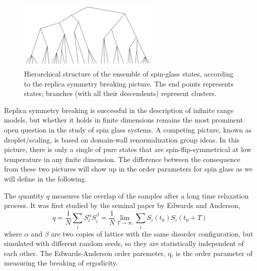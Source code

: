 
\begin{figure}[!h]
  \label{fig:TreeRSB}
  \centering
  \includegraphics[width=0.6\textwidth]{img/TreeRSB.png}
  \caption{Hierarchical structure of the ensemble of spin-glass states, according
to the replica symmetry breaking picture. The end points represents states; branches (with all their descendents)
represent clusters.}
\end{figure}


Replica symmetry breaking is successful in the description of infinite range models, but whether it 
holds in finite dimensions remains the most prominent open question in the study of spin glass systems. 
A competing picture, known as droplet/scaling\cite{Fisher-Huse-1987,Fisher-Huse-1988}, 
is based on domain-wall 
renormalization group ideas. In this picture, there is only a single of
pure states that are spin-flip-symmetrical at low temperature in any finite 
dimension. The difference between the consequence from these two pictures 
will show up in the order parameters for spin glass as we will define in the following.


The quantity $q$ measures the overlap of the samples after a long time relaxation process. 
It was first studied by the seminal paper by Edwards and Anderson,
\begin{equation}
  \label{eq:q}
  q=\frac{1}{N}\sum_iS_i^\alpha S_i^\beta=\frac{1}{N}\lim_{T\to \infty}\sum_iS_i(t_0)S_i(t_0+T)
\end{equation}
where $\alpha$ and $\beta$ are two copies of lattice with the same disorder 
configuration, but simulated with different random seeds, so they are
statistically independent of each other. The Edwards-Anderson order paremeter, q, 
is the order parameter of measuring the breaking of ergodicity. 

